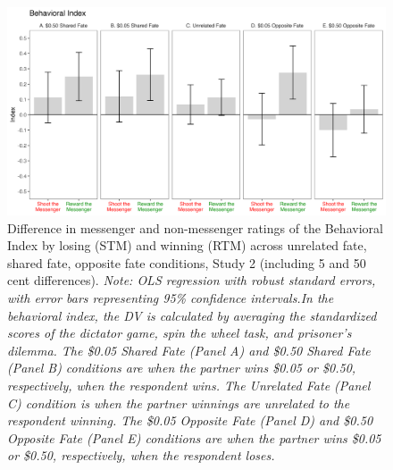 \renewcommand{\baselinestretch}{1.25}%
\begin{figure}[!t]%
  \centering
  \includegraphics[width=1.0\textwidth]{figures/study2_main_fivecent_behavior_all.png}
  \caption{Difference in messenger and non-messenger ratings of the Behavioral Index by losing (STM) and winning (RTM) across unrelated fate, shared fate, opposite fate conditions, Study 2 (including 5 and 50 cent differences). 
  \textit{Note: OLS regression with robust standard errors, with error bars representing 95\% confidence intervals.In the behavioral index, the DV is calculated by averaging the standardized scores of the dictator game, spin the wheel task, and prisoner's dilemma. The \$0.05 Shared Fate (Panel A) and \$0.50 Shared Fate (Panel B) conditions are when the partner wins \$0.05 or \$0.50, respectively, when the respondent wins. The Unrelated Fate (Panel C) condition is when the partner winnings are unrelated to the respondent winning. The \$0.05 Opposite Fate (Panel D) and \$0.50 Opposite Fate (Panel E) conditions are when the partner wins \$0.05 or \$0.50, respectively, when the respondent loses.}}
  \label{fig:study2_main_fivecent_behavior_all}
\end{figure}%
\renewcommand{\baselinestretch}{1.67}%
